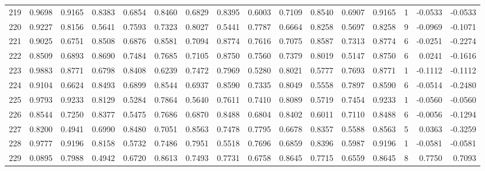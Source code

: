 \begin{tabular}{lrrrrrrrrrrrrrrr}
219 &      0.9698 &  0.9165 &  0.8383 &  0.6854 &  0.8460 &  0.6829 &  0.8395 &  0.6003 &  0.7109 &  0.8540 &   0.6907 &     0.9165 &      1 &                   -0.0533 &                    -0.0533 \\
220 &      0.9227 &  0.8156 &  0.5641 &  0.7593 &  0.7323 &  0.8027 &  0.5441 &  0.7787 &  0.6664 &  0.8258 &   0.5697 &     0.8258 &      9 &                   -0.0969 &                    -0.1071 \\
221 &      0.9025 &  0.6751 &  0.8508 &  0.6876 &  0.8581 &  0.7094 &  0.8774 &  0.7616 &  0.7075 &  0.8587 &   0.7313 &     0.8774 &      6 &                   -0.0251 &                    -0.2274 \\
222 &      0.8509 &  0.6893 &  0.8690 &  0.7484 &  0.7685 &  0.7105 &  0.8750 &  0.7560 &  0.7379 &  0.8019 &   0.5147 &     0.8750 &      6 &                    0.0241 &                    -0.1616 \\
223 &      0.9883 &  0.8771 &  0.6798 &  0.8408 &  0.6239 &  0.7472 &  0.7969 &  0.5280 &  0.8021 &  0.5777 &   0.7693 &     0.8771 &      1 &                   -0.1112 &                    -0.1112 \\
224 &      0.9104 &  0.6624 &  0.8493 &  0.6899 &  0.8544 &  0.6937 &  0.8590 &  0.7335 &  0.8049 &  0.5558 &   0.7897 &     0.8590 &      6 &                   -0.0514 &                    -0.2480 \\
225 &      0.9793 &  0.9233 &  0.8129 &  0.5284 &  0.7864 &  0.5640 &  0.7611 &  0.7410 &  0.8089 &  0.5719 &   0.7454 &     0.9233 &      1 &                   -0.0560 &                    -0.0560 \\
226 &      0.8544 &  0.7250 &  0.8377 &  0.5475 &  0.7686 &  0.6870 &  0.8488 &  0.6804 &  0.8402 &  0.6011 &   0.7110 &     0.8488 &      6 &                   -0.0056 &                    -0.1294 \\
227 &      0.8200 &  0.4941 &  0.6990 &  0.8480 &  0.7051 &  0.8563 &  0.7478 &  0.7795 &  0.6678 &  0.8357 &   0.5588 &     0.8563 &      5 &                    0.0363 &                    -0.3259 \\
228 &      0.9777 &  0.9196 &  0.8158 &  0.5732 &  0.7486 &  0.7951 &  0.5518 &  0.7696 &  0.6859 &  0.8396 &   0.5987 &     0.9196 &      1 &                   -0.0581 &                    -0.0581 \\
229 &      0.0895 &  0.7988 &  0.4942 &  0.6720 &  0.8613 &  0.7493 &  0.7731 &  0.6758 &  0.8645 &  0.7715 &   0.6559 &     0.8645 &      8 &                    0.7750 &                     0.7093 \\

\end{tabular}
